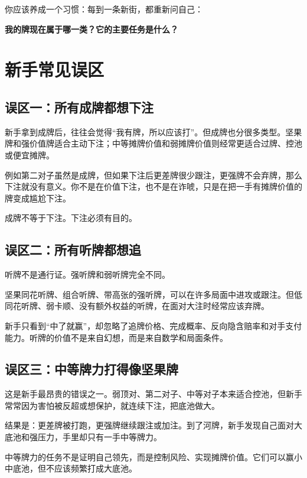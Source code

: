 你应该养成一个习惯：每到一条新街，都重新问自己：

\begin{center}
\textbf{我的牌现在属于哪一类？它的主要任务是什么？}
\end{center}

\section{新手常见误区}

\subsection{误区一：所有成牌都想下注}

新手拿到成牌后，往往会觉得“我有牌，所以应该打”。但成牌也分很多类型。坚果牌和强价值牌适合主动下注；中等摊牌价值和弱摊牌价值则经常更适合过牌、控池或便宜摊牌。

例如第二对子虽然是成牌，但如果下注后更差牌很少跟注，更强牌不会弃牌，那么下注就没有意义。你不是在价值下注，也不是在诈唬，只是在把一手有摊牌价值的牌变成尴尬下注。

成牌不等于下注。下注必须有目的。

\subsection{误区二：所有听牌都想追}

听牌不是通行证。强听牌和弱听牌完全不同。

坚果同花听牌、组合听牌、带高张的强听牌，可以在许多局面中进攻或跟注。但低同花听牌、弱卡顺、没有额外权益的听牌，在面对大注时经常应该弃牌。

新手只看到“中了就赢”，却忽略了追牌价格、完成概率、反向隐含赔率和对手支付能力。听牌的价值不是来自幻想，而是来自数学和局面条件。

\subsection{误区三：中等牌力打得像坚果牌}

这是新手最昂贵的错误之一。弱顶对、第二对子、中等对子本来适合控池，但新手常常因为害怕被反超或想保护，就连续下注，把底池做大。

结果是：更差牌被打跑，更强牌继续跟注或加注。到了河牌，新手发现自己面对大底池和强压力，手里却只有一手中等牌力。

中等牌力的任务不是证明自己领先，而是控制风险、实现摊牌价值。它们可以赢小中底池，但不应该频繁打成大底池。

